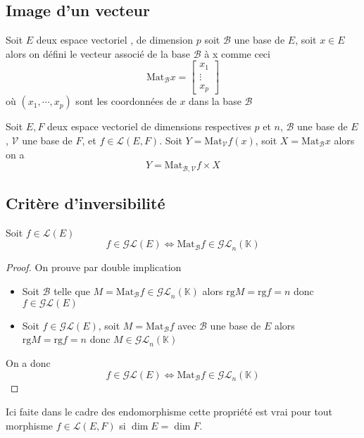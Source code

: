 \documentclass[11pt,colorlinks]{book}
\theoremstyle{mytheoremstyle}
\theoremstyle{mytheoremstyle}
\theoremstyle{mytheoremstyle}
\theoremstyle{mytheoremstyle}
\theoremstyle{mytheoremstyle}
\theoremstyle{mytheoremstyle}
\theoremstyle{mytheoremstyle}
\theoremstyle{mytheoremstyle}
\theoremstyle{myproblemstyle}
\def\mbb#1{\mathbb{#1}}
\def\mfc#1{\mathcal{#1}}
\def\bK{\mbb{K}}
\def\ev{espace vectoriel }
\def\mor{\mfc{L}(E,F)}
\begin{document}
\subsection{Image d'un vecteur}
\begin{definition}
  Soit $E$ deux \ev, de dimension $p$ soit $\mfc{B}$ une base de $E$,
  soit $x \in E$ alors on défini le vecteur associé de la base $\mfc{B}$ à x comme ceci
  \begin{equation*}
    \text{Mat}_{\mfc{B}} x = \begin{bmatrix}
      x_1 \\ 
      \vdots \\ 
      x_p
    \end{bmatrix}
  \end{equation*}
  où $(x_1,\cdots,x_p)$ sont les coordonnées de $x$ dans la base $\mfc{B}$
\end{definition}
\begin{prop}
  Soit $E,F$ deux \ev de dimensions respectives $p$ et $n$, $\mfc{B}$ une base de $E$, $\mfc{V}$ une base de $F$, et $f \in \mor$.
  Soit $Y = \text{Mat}_{\mfc{V}} f(x)$, soit $X = \text{Mat}_{\mfc{B}} x$ alors on a 
  \begin{equation*}
    Y = \text{Mat}_{\mfc{B},\mfc{V}} f \times X
  \end{equation*}
\end{prop}
\subsection{Critère d'inversibilité}
\begin{prop}
  Soit $f \in \mfc{L}(E)$
  \begin{equation*}
    f \in \mfc{GL}(E) \Leftrightarrow \text{Mat}_{\mfc{B}} f \in \mfc{GL}_n(\bK)
  \end{equation*}
  \begin{proof}
    On prouve par double implication
    \begin{itemize}
      \item Soit $\mfc{B}$ telle que $M = \text{Mat}_{\mfc{B}} f \in \mfc{GL}_n(\bK)$ alors $\text{rg}  M = \text{rg}  f = n$ donc $f \in \mfc{GL}(E)$
      \item Soit $f \in \mfc{GL}(E)$, soit $M = \text{Mat}_{\mfc{B}} f$ avec $\mfc{B}$ une base de $E$ alors $\text{rg}  M = \text{rg} f = n$ donc $M \in \mfc{GL}_n(\bK)$
    \end{itemize}
    On a donc 
    \begin{equation*}
      f \in \mfc{GL}(E) \Leftrightarrow \text{Mat}_{\mfc{B}} f \in \mfc{GL}_n(\bK)
    \end{equation*}
  \end{proof}
  \begin{rmq}
    Ici faite dans le cadre des endomorphisme cette propriété est vrai pour tout morphisme $f \in \mfc{L}(E,F)$ si $\dim E = \dim F$.
  \end{rmq}
\end{prop}
\end{document}
